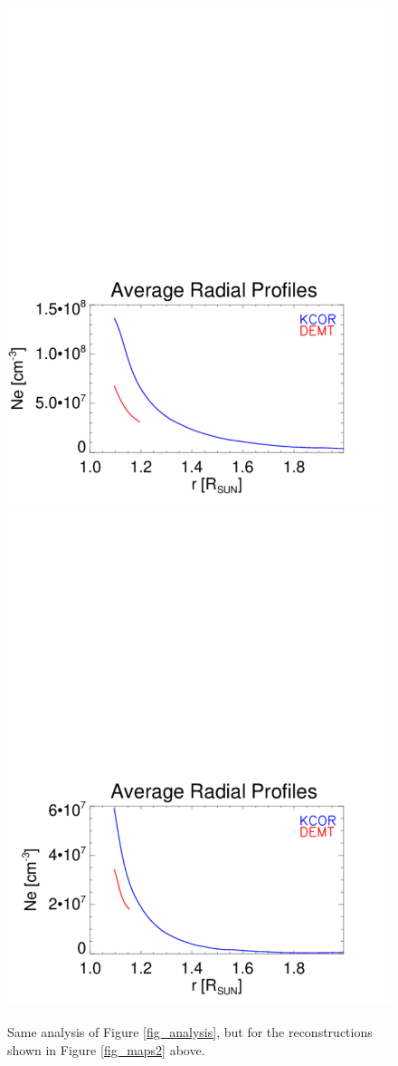 \documentclass[baaa]{baaa}
\begin{document}
\begin{figure}[!ht]
  \includegraphics[width=0.75\columnwidth]{Average_Radial_Profiles_KCOR-Tom_vs_DEMT_CR2198_Hh_l39_kcor_1e-5_bloqueados-Quiet-region1.pdf}
  \hskip 2cm
  \includegraphics[width=0.75\columnwidth]{Average_Radial_Profiles_KCOR-Tom_vs_DEMT_CR2198_Hh_l39_kcor_1e-5_bloqueados-Open-region_N.pdf}
  \caption{Same analysis of Figure \ref{fig_analysis}, but for the reconstructions shown in Figure \ref{fig_maps2} above.}
  \label{fig_analysis2}
\end{figure}
\end{document}
